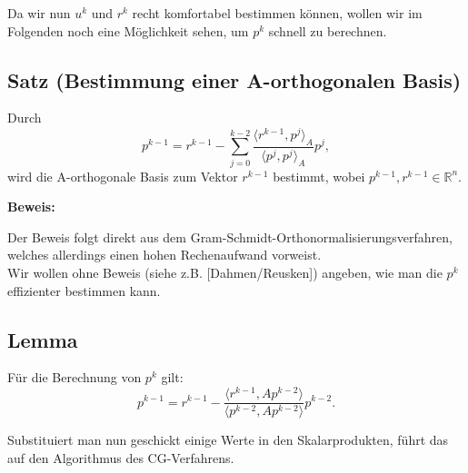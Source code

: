Da wir nun $u^{k}$ und $r^{k}$ recht komfortabel bestimmen können, wollen wir im Folgenden noch eine Möglichkeit sehen, um $p^{k}$ schnell zu berechnen.

\subsection{Satz (Bestimmung einer A-orthogonalen Basis)}
Durch
\begin{equation}
p^{k-1} = r^{k-1} - \sum_{j=0}^{k-2} \frac {\langle r^{k-1}, p^{j} \rangle _{A}} {\langle p^{j}, p^{j} \rangle _{A}} p^{j},
\end{equation}
wird die A-orthogonale Basis zum Vektor $r^{k-1}$ bestimmt, wobei $p^{k-1},r^{k-1} \in \mathbb{R}^{n}$.

\textbf{Beweis:}

Der Beweis folgt direkt aus dem Gram-Schmidt-Orthonormalisierungsverfahren, welches allerdings einen hohen Rechenaufwand vorweist.\\
Wir wollen ohne Beweis (siehe z.B. [Dahmen/Reusken]) angeben, wie man die $p^{k}$ effizienter bestimmen kann.

\subsection{Lemma}
Für die Berechnung von $p^{k}$ gilt:
\begin{equation}
p^{k-1} = r^{k-1} - \frac {\langle r^{k-1}, Ap^{k-2} \rangle} {\langle p^{k-2}, Ap^{k-2} \rangle} p^{k-2}.
\end{equation}

Substituiert man nun geschickt einige Werte in den Skalarprodukten, führt das auf den Algorithmus des CG-Verfahrens.



